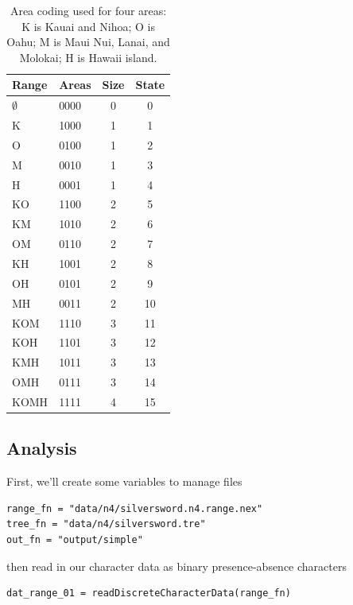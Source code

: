 \begin{table}[!ht]
\centering
\begin{tabular}{llcc}
Range & Areas & Size & State \\ \hline
$\emptyset$ & 0000 & 0 & 0 \\
K    & 1000 & 1 & 1 \\
O    & 0100 & 1 & 2 \\
M    & 0010 & 1 & 3 \\
H    & 0001 & 1 & 4 \\
KO   & 1100 & 2 & 5 \\
KM   & 1010 & 2 & 6 \\
OM   & 0110 & 2 & 7 \\
KH   & 1001 & 2 & 8 \\
OH   & 0101 & 2 & 9 \\
MH   & 0011 & 2 & 10 \\
KOM  & 1110 & 3 & 11 \\ 
KOH  & 1101 & 3 & 12 \\
KMH  & 1011 & 3 & 13 \\
OMH  & 0111 & 3 & 14 \\
KOMH & 1111 & 4 & 15 \\
\end{tabular}
\caption{Area coding used for four areas: K is Kauai and Nihoa; O is Oahu; M is Maui Nui, Lanai, and Molokai; H is Hawaii island.}
\end{table}

\subsection*{Analysis}

First, we'll create some variables to manage files

\begin{snugshade*}
\begin{lstlisting}
range_fn = "data/n4/silversword.n4.range.nex"
tree_fn = "data/n4/silversword.tre"
out_fn = "output/simple"
\end{lstlisting}
\end{snugshade*}

then read in our character data as binary presence-absence characters

\begin{snugshade}
\begin{lstlisting}
dat_range_01 = readDiscreteCharacterData(range_fn)
\end{lstlisting}
\end{snugshade}

